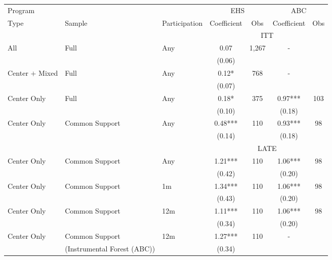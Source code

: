 \begin{tabular}{lllcccc}
\toprule 
\midrule 
\multicolumn{3}{l}{Program} & \multicolumn{2}{c}{EHS} & \multicolumn{2}{c}{ABC} \\
 \cmidrule(lr){1-3} \cmidrule(lr){4-5} \cmidrule(lr){6-7} 
Type & Sample & Participation & Coefficient & Obs & Coefficient & Obs \\
\midrule 
\multicolumn{3}{c}{} & \multicolumn{4}{c}{ITT} \\
 \cmidrule(lr){4-7} 
All & Full & Any & 0.07 & 1,267 & - \\
 &  &  & (0.06) &  \\
Center $+$ Mixed & Full & Any & 0.12* & 768 & - \\
 &  &  & (0.07) &  \\
Center Only & Full & Any & 0.18* & 375 & 0.97*** & 103 \\
 &  &  & (0.10) &  & (0.18) &  \\
Center Only & Common Support & Any & 0.48*** & 110 & 0.93*** & 98 \\
 &  &  & (0.14) &  & (0.18) &  \\
\midrule 
\multicolumn{3}{c}{} & \multicolumn{4}{c}{LATE} \\
 \cmidrule(lr){4-7} 
Center Only & Common Support & Any & 1.21*** & 110 & 1.06*** & 98 \\
 &  &  & (0.42) &  & (0.20) &  \\
Center Only & Common Support & 1m & 1.34*** & 110 & 1.06*** & 98 \\
 &  &  & (0.43) &  & (0.20) &  \\
Center Only & Common Support & 12m & 1.11*** & 110 & 1.06*** & 98 \\
 &  &  & (0.34) &  & (0.20) &  \\
Center Only & Common Support & 12m & 1.27*** & 110 & - \\
 & (Instrumental Forest (ABC)) &  & (0.34) &  \\
\midrule 
\bottomrule 
\end{tabular}
